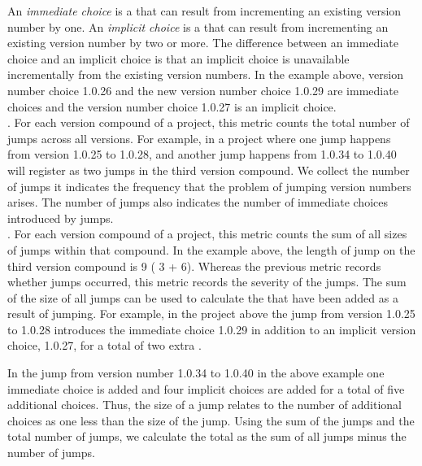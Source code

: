 \documentclass[conference]{IEEEtran}
\begin{document}
An \emph{immediate choice} is a \choice that can result from incrementing an existing version number by one. 
An \emph{implicit choice} is a \choice that can result from incrementing an existing version number by two or more.
The difference between an immediate choice and an implicit choice is that an implicit choice is unavailable incrementally from the existing version numbers. 
In the example above, version number choice 1.0.26 and the new version number choice 1.0.29 are immediate choices and the version number choice 1.0.27 is an implicit choice.
\\
 
.  For each version compound of a project, this metric counts the total number of jumps across all versions. For example, in a project where one jump happens from version 1.0.25 to 1.0.28, and another jump happens from 1.0.34 to 1.0.40 will register as two jumps in the third version compound.
We collect the number of jumps it indicates the frequency that the problem of jumping version numbers arises. 
The number of jumps also indicates the number of immediate choices introduced by jumps.\\

.  For each version compound of a project, this metric counts the sum of all sizes of jumps within that compound. 
In the example above, the length of jump on the third version compound is 
9 ( 3 + 6). Whereas the previous metric records whether jumps occurred, this metric records the severity of the jumps. 
The sum of the size of all jumps can be used to calculate the \numberchoices that have been added as a result of jumping.
For example, in the project above the jump from version 1.0.25 to 1.0.28 introduces the immediate choice 1.0.29 in addition to an implicit version choice, 1.0.27, for a total of two extra \choices.

In the jump from version number 1.0.34 to 1.0.40 in the above example one immediate choice is added and four implicit choices are added for a total of five additional choices.
Thus, the size of a jump relates to the number of additional choices as one less than the size of the jump.
Using the sum of the jumps and the total number of jumps, we calculate the total \numberchoices as the sum of all jumps minus the number of jumps.\\
\end{document}
